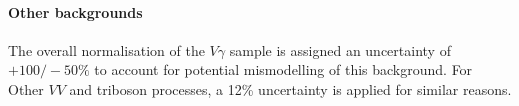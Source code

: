 \paragraph{Other backgrounds}
The overall normalisation of the $V\gamma$ sample is assigned an uncertainty of $+100/-50\%$ to account for potential mismodelling of this background. For Other $VV$ and triboson processes, a 12\% uncertainty is applied for similar reasons. 




